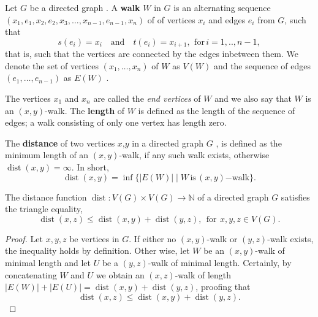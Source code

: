 Let $G$ be a directed graph . A
\textbf{walk} $W$ in $G$ is an alternating sequence
$(x_1,e_1,x_2,e_2,x_3,\ldots,x_{n-1},e_{n-1},x_n)$ of of vertices
$x_i$ and edges $e_i$ from $G$, such that
\[
s(e_i) = x_i \quad \mathrm{and} \quad t(e_i) = x_{i+1}, \:\,
\mathrm{for}\, i=1,..,n-1,
\]
that is, such that the vertices are connected by the edges inbetween
them. We denote the set of vertices $(x_1,\ldots,x_n)$ of $W$ as
$V(W)$ and the sequence of edges $(e_1,\dots,e_{n-1})$ as $E(W)$
.

The vertices $x_1$ and $x_n$ are called the \textit{end vertices} of
$W$ and we also say that $W$ is an $(x,y)$-walk. The \textbf{length}
of $W$ is defined as the length of the sequence of edges; a walk
consisting of only one vertex has length zero. 


\begin{definition}[Distance]
  The \textbf{distance} of two vertices $x$,$y$ in a directed graph
  $G$ , is defined as the minimum length of an
  $(x,y)$-walk, if any such walk exists, otherwise
  $\operatorname{dist}(x,y)=\infty$. In short,
  \[
  \operatorname{dist}(x,y) = \inf \{|E(W)| \mid
  W\,\mathrm{is}\,(x,y)\mathrm{-walk}\}.
  \]
\end{definition}

\begin{proposition}
  The distance function $\operatorname{dist}: V(G) \times V(G) \to
  \mathbb{N}$ of a directed graph $G$ satisfies the triangle equality,
  \[
  \operatorname{dist}(x,z) \le \operatorname{dist}(x,y) +
  \operatorname{dist}(y,z), \:\: \mathrm{for}\:\, x,y,z \in V(G).
  \]
\end{proposition}

\begin{proof}
  Let $x,y,z$ be vertices in $G$. If either no $(x,y)$-walk or
  $(y,z)$-walk exists, the inequality holds by definition. Other wise,
  let $W$ be an $(x,y)$-walk of minimal length and let $U$ be a
  $(y,z)$-walk of minimal length. Certainly, by concatenating $W$ and
  $U$ we obtain an $(x,z)$-walk of length $|E(W)| + |E(U)| =
  \operatorname{dist}(x,y) + \operatorname{dist}(y,z)$, proofing
  that \[ \operatorname{dist}(x,z) \le \operatorname{dist}(x,y) +
  \operatorname{dist}(y,z).
  \]
\end{proof}







